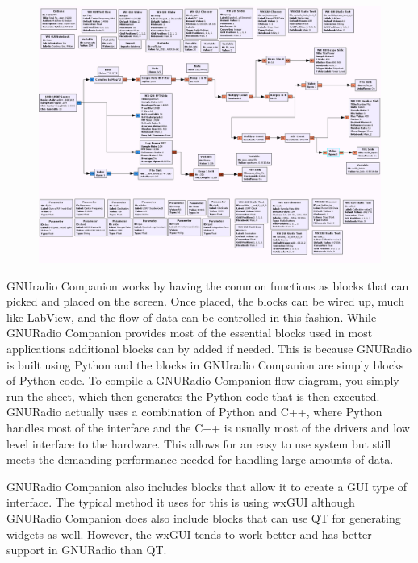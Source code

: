 {\begin{figure}[h!tb] 
\centering
\includegraphics[width=17cm]{Images/N200_radiometer_grc.png}
\label{N200_GRC}
\end{figure}
}

GNUradio Companion works by having the common functions as blocks that can picked and placed on the screen.  Once placed, the blocks can be wired up, much like LabView, and the flow of data can be controlled in this fashion.  While GNURadio Companion provides most of the essential blocks used in most applications additional blocks can by added if needed.  This is because GNURadio is built using Python and the blocks in GNUradio Companion are simply blocks of Python code.  To compile a GNURadio Companion flow diagram, you simply run the sheet, which then generates the Python code that is then executed.  GNURadio actually uses a combination of Python and C++, where Python handles most of the interface and the C++ is usually most of the drivers and low level interface to the hardware.  This allows for an easy to use system but still meets the demanding performance needed for handling large amounts of data.  

GNURadio Companion also includes blocks that allow it to create a GUI type of interface.  The typical method it uses for this is using wxGUI although GNURadio Companion does also include blocks that can use QT for generating widgets as well.  However, the wxGUI tends to work better and has better support in GNURadio than QT.  

